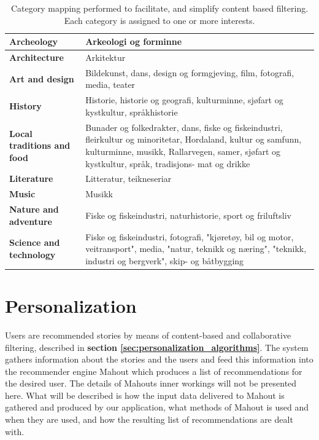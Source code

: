 \begin{table}[!h]
	\begin{center}
		\begin{tabular}{ | p{5cm} | p{12cm}|}
			\hline
			\textbf{Archeology} & Arkeologi og forminne \\ \hline
			\textbf{Architecture} & Arkitektur \\ \hline
			\textbf{Art and design} & Bildekunst, dans, design og formgjeving, film, fotografi, media, teater \\ \hline
			\textbf{History} & Historie, historie og geografi, kulturminne, sjøfart og kystkultur, språkhistorie \\ \hline
			\textbf{Local traditions and food} & Bunader og folkedrakter, dans, fiske og fiskeindustri, fleirkultur og minoritetar, Hordaland, kultur og samfunn, kulturminne, musikk, Rallarvegen, samer, sjøfart og kystkultur, språk, tradisjons- mat og drikke \\ \hline
			\textbf{Literature } & Litteratur, teikneseriar \\ \hline
			\textbf{Music} & Musikk \\ \hline
			\textbf{Nature and adventure} & Fiske og fiskeindustri, naturhistorie, sport og friluftsliv \\ \hline
			\textbf{Science and technology} & Fiske og fiskeindustri, fotografi, "kjøretøy, bil og motor, veitransport", media, "natur, teknikk og næring", "teknikk, industri og bergverk", skip- og båtbygging \\ \hline
		\end{tabular}
	\end{center}
	\caption{Category mapping performed to facilitate, and simplify content based filtering. Each category is assigned to one or more interests.}
	\label{Tab:categorymapping}
\end{table}

\section{Personalization}
\label{sec:personalization_how}

Users are recommended stories by means of content-based and collaborative filtering, described in \textbf{section \ref{sec:personalization_algorithms}}. The system gathers information about the stories and the users and feed this information into the recommender engine Mahout which produces a list of recommendations for the desired user. The details of Mahouts inner workings will not be presented here. What will be described is how the input data delivered to Mahout is gathered and produced by our application, what methods of Mahout is used and when they are used, and how the resulting list of recommendations are dealt with.\newline

